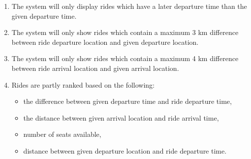 \documentclass{article}
\begin{document}
\begin{enumerate}[label=(\alph*)]
    \item The system will only display rides which have a later departure time than the given departure time.
    \item The system will only show rides which contain a maximum 3 km difference between ride departure location and given departure location.
    \item The system will only show rides which contain a maximum 4 km difference between ride arrival location and given arrival location.
    \item Rides are partly ranked based on the following:
        \begin{itemize}
            \item the difference between given departure time and ride departure time,
            \item the distance between given arrival location and ride arrival time,
            \item number of seats available, 
            \item distance between given departure location and ride departure time.
        \end{itemize}
\end{enumerate}
\end{document}
